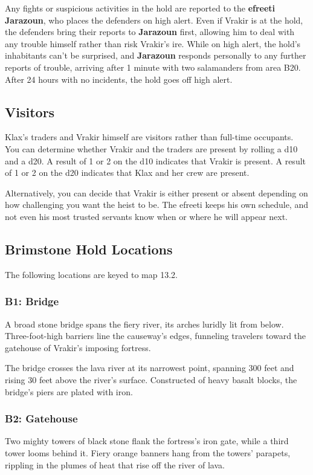 \documentclass[10pt,a4paper,twoside,bg=print,twocolumn,openany,nodeprecatedcode]{dndbook}
\begin{document}
Any fights or suspicious activities in the hold are reported to the \textbf{efreeti} \textbf{Jarazoun}, who places the defenders on high alert. Even if Vrakir is at the hold, the defenders bring their reports to \textbf{Jarazoun} first, allowing him to deal with any trouble himself rather than risk Vrakir's ire. While on high alert, the hold's inhabitants can't be surprised, and \textbf{Jarazoun} responds personally to any further reports of trouble, arriving after 1 minute with two salamanders from area B20. After 24 hours with no incidents, the hold goes off high alert.

\subsection{Visitors}
Klax's traders and Vrakir himself are visitors rather than full-time occupants. You can determine whether Vrakir and the traders are present by rolling a d10 and a d20. A result of 1 or 2 on the d10 indicates that Vrakir is present. A result of 1 or 2 on the d20 indicates that Klax and her crew are present.

Alternatively, you can decide that Vrakir is either present or absent depending on how challenging you want the heist to be. The efreeti keeps his own schedule, and not even his most trusted servants know when or where he will appear next.

\subsection{Brimstone Hold Locations}
The following locations are keyed to map 13.2.

\subsubsection{B1: Bridge}
\begin{DndReadAloud}{}
A broad stone bridge spans the fiery river, its arches luridly lit from below. Three-foot-high barriers line the causeway's edges, funneling travelers toward the gatehouse of Vrakir's imposing fortress.

\end{DndReadAloud}

The bridge crosses the lava river at its narrowest point, spanning 300 feet and rising 30 feet above the river's surface. Constructed of heavy basalt blocks, the bridge's piers are plated with iron.

\subsubsection{B2: Gatehouse}
\begin{DndReadAloud}{}
Two mighty towers of black stone flank the fortress's iron gate, while a third tower looms behind it. Fiery orange banners hang from the towers' parapets, rippling in the plumes of heat that rise off the river of lava.

\end{DndReadAloud}
\end{document}
